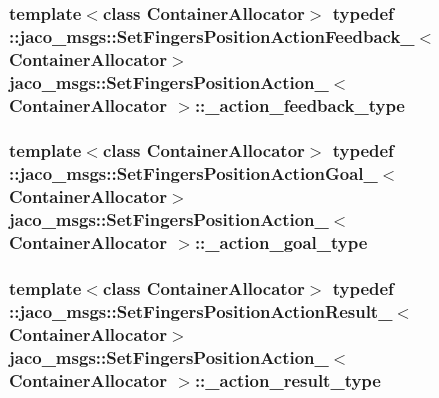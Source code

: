 \subsubsection[{\texorpdfstring{\+\_\+action\+\_\+feedback\+\_\+type}{_action_feedback_type}}]{\setlength{\rightskip}{0pt plus 5cm}template$<$class Container\+Allocator$>$ typedef \+::{\bf jaco\+\_\+msgs\+::\+Set\+Fingers\+Position\+Action\+Feedback\+\_\+}$<$Container\+Allocator$>$ {\bf jaco\+\_\+msgs\+::\+Set\+Fingers\+Position\+Action\+\_\+}$<$ Container\+Allocator $>$\+::{\bf \+\_\+action\+\_\+feedback\+\_\+type}}\hypertarget{structjaco__msgs_1_1SetFingersPositionAction___a54563ee7e767db8e6268b91ef39d5cb6}{}\label{structjaco__msgs_1_1SetFingersPositionAction___a54563ee7e767db8e6268b91ef39d5cb6}
\subsubsection[{\texorpdfstring{\+\_\+action\+\_\+goal\+\_\+type}{_action_goal_type}}]{\setlength{\rightskip}{0pt plus 5cm}template$<$class Container\+Allocator$>$ typedef \+::{\bf jaco\+\_\+msgs\+::\+Set\+Fingers\+Position\+Action\+Goal\+\_\+}$<$Container\+Allocator$>$ {\bf jaco\+\_\+msgs\+::\+Set\+Fingers\+Position\+Action\+\_\+}$<$ Container\+Allocator $>$\+::{\bf \+\_\+action\+\_\+goal\+\_\+type}}\hypertarget{structjaco__msgs_1_1SetFingersPositionAction___a37902d96f4f497c90f453085f9f8d9d8}{}\label{structjaco__msgs_1_1SetFingersPositionAction___a37902d96f4f497c90f453085f9f8d9d8}
\subsubsection[{\texorpdfstring{\+\_\+action\+\_\+result\+\_\+type}{_action_result_type}}]{\setlength{\rightskip}{0pt plus 5cm}template$<$class Container\+Allocator$>$ typedef \+::{\bf jaco\+\_\+msgs\+::\+Set\+Fingers\+Position\+Action\+Result\+\_\+}$<$Container\+Allocator$>$ {\bf jaco\+\_\+msgs\+::\+Set\+Fingers\+Position\+Action\+\_\+}$<$ Container\+Allocator $>$\+::{\bf \+\_\+action\+\_\+result\+\_\+type}}\hypertarget{structjaco__msgs_1_1SetFingersPositionAction___ab486a84dee9108af1e1b18fdd3c19bb2}{}\label{structjaco__msgs_1_1SetFingersPositionAction___ab486a84dee9108af1e1b18fdd3c19bb2}
